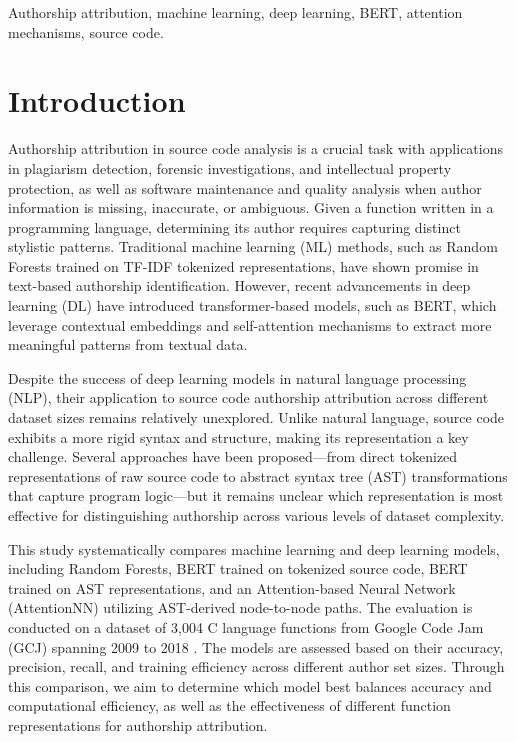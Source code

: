 \documentclass[conference]{IEEEtran}
\begin{document}
\begin{IEEEkeywords}
Authorship attribution, machine learning, deep learning, BERT, attention mechanisms, source code.
\end{IEEEkeywords}

\section{Introduction}

Authorship attribution in source code analysis is a crucial task with applications in plagiarism detection, forensic investigations, 
and intellectual property protection, as well as software maintenance and quality analysis when author information is missing, inaccurate, 
or ambiguous. Given a function written in a programming language, determining its author requires capturing distinct stylistic patterns. 
Traditional machine learning (ML) methods, such as Random Forests trained on TF-IDF tokenized representations, have shown promise in text-based 
authorship identification. However, recent advancements in deep learning (DL) have introduced transformer-based models, such as BERT, which leverage 
contextual embeddings and self-attention mechanisms to extract more meaningful patterns from textual data.

Despite the success of deep learning models in natural language processing (NLP), their application to source code authorship 
attribution across different dataset sizes remains relatively unexplored. Unlike natural language, source code exhibits a more 
rigid syntax and structure, making its representation a key challenge. Several approaches have been proposed—from direct tokenized 
representations of raw source code to abstract syntax tree (AST) transformations that capture program logic—but it remains unclear which 
representation is most effective for distinguishing authorship across various levels of dataset complexity.

This study systematically compares machine learning and deep learning models, including Random Forests, BERT trained on tokenized source code, 
BERT trained on AST representations, and an Attention-based Neural Network (AttentionNN) utilizing AST-derived node-to-node paths. The evaluation 
is conducted on a dataset of 3,004 C language functions from Google Code Jam (GCJ) spanning 2009 to 2018 \cite{gcj}. The models are assessed 
based on their accuracy, precision, recall, and training efficiency across different author set sizes. Through this comparison, we aim to 
determine which model best balances accuracy and computational efficiency, as well as the effectiveness of different function representations 
for authorship attribution.
\end{document}
